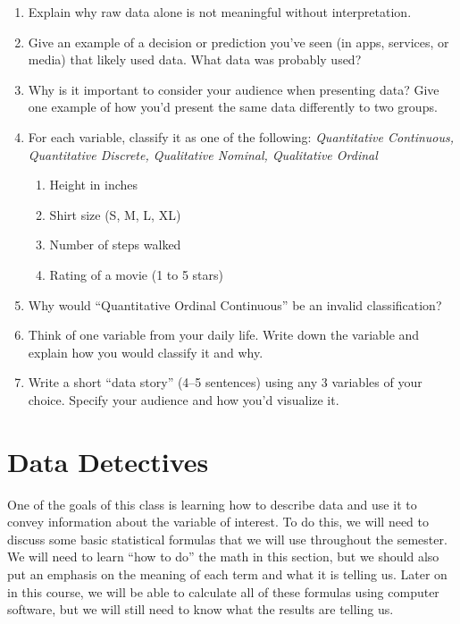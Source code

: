 \documentclass[
  letterpaper,
  DIV=11,
  numbers=noendperiod]{scrreprt}
\providecommand{\tightlist}{%
  \setlength{\itemsep}{0pt}\setlength{\parskip}{0pt}}
\begin{document}
\begin{enumerate}
\def\labelenumi{\arabic{enumi}.}
\item
  Explain why raw data alone is not meaningful without interpretation.
\item
  Give an example of a decision or prediction you've seen (in apps,
  services, or media) that likely used data. What data was probably
  used?
\item
  Why is it important to consider your audience when presenting data?
  Give one example of how you'd present the same data differently to two
  groups.
\item
  For each variable, classify it as one of the following:
  \emph{Quantitative Continuous, Quantitative Discrete, Qualitative
  Nominal, Qualitative Ordinal}

  \begin{enumerate}
  \def\labelenumii{\alph{enumii}.}
  \tightlist
  \item
    Height in inches\\
  \item
    Shirt size (S, M, L, XL)\\
  \item
    Number of steps walked\\
  \item
    Rating of a movie (1 to 5 stars)
  \end{enumerate}
\item
  Why would ``Quantitative Ordinal Continuous'' be an invalid
  classification?
\item
  Think of one variable from your daily life. Write down the variable
  and explain how you would classify it and why.
\item
  Write a short ``data story'' (4--5 sentences) using any 3 variables of
  your choice. Specify your audience and how you'd visualize it.
\end{enumerate}


\chapter{Data Detectives}\label{data-detectives}

One of the goals of this class is learning how to describe data and use
it to convey information about the variable of interest. To do this, we
will need to discuss some basic statistical formulas that we will use
throughout the semester. We will need to learn ``how to do'' the math in
this section, but we should also put an emphasis on the meaning of each
term and what it is telling us. Later on in this course, we will be able
to calculate all of these formulas using computer software, but we will
still need to know what the results are telling us.
\end{document}
